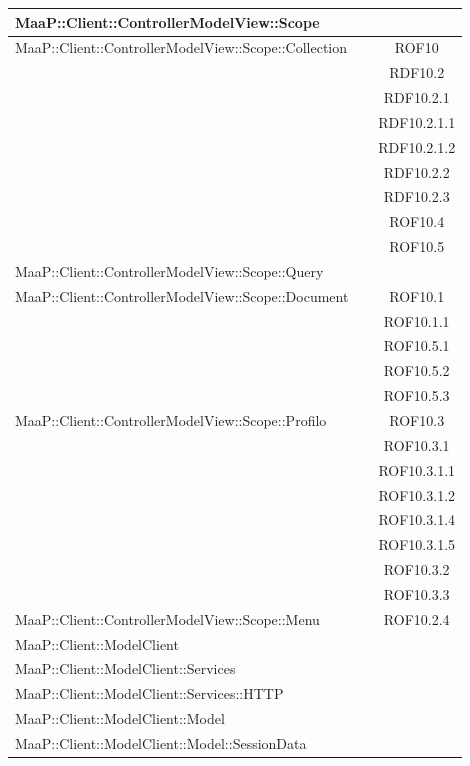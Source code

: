 \begin{center}
\begin{longtable}{|p{0.8\linewidth}|c|}
\midrule 
MaaP::Client::ControllerModelView::Scope
& \\

\midrule 
MaaP::Client::ControllerModelView::Scope::Collection
& ROF10\\
& RDF10.2\\
& RDF10.2.1\\
& RDF10.2.1.1\\
& RDF10.2.1.2\\
& RDF10.2.2\\
& RDF10.2.3\\
& ROF10.4\\
& ROF10.5\\

\midrule 
MaaP::Client::ControllerModelView::Scope::Query
& \\

\midrule 
MaaP::Client::ControllerModelView::Scope::Document
& ROF10.1\\
& ROF10.1.1\\
& ROF10.5.1\\
& ROF10.5.2\\
& ROF10.5.3\\


\midrule 
MaaP::Client::ControllerModelView::Scope::Profilo
& ROF10.3\\
& ROF10.3.1\\
& ROF10.3.1.1\\
& ROF10.3.1.2\\
& ROF10.3.1.4\\
& ROF10.3.1.5\\
& ROF10.3.2\\
& ROF10.3.3\\


\midrule 
MaaP::Client::ControllerModelView::Scope::Menu
& ROF10.2.4\\

\midrule 
MaaP::Client::ModelClient
& \\

\midrule 
MaaP::Client::ModelClient::Services
& \\

\midrule 
MaaP::Client::ModelClient::Services::HTTP
& \\

\midrule 
MaaP::Client::ModelClient::Model
& \\

\midrule 
MaaP::Client::ModelClient::Model::SessionData
& \\

\end{longtable}
\end{center}

